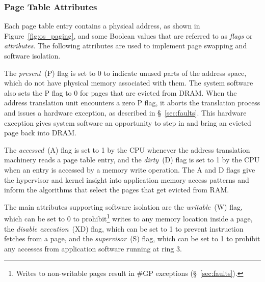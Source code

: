 \subsubsection{Page Table Attributes}
\label{sec:page_table_attributes}

Each page table entry contains a physical address, as shown in
Figure~\ref{fig:os_paging}, and some Boolean values that are referred to as
\textit{flags} or \textit{attributes}. The following attributes are used to
implement page swapping and software isolation.

The \textit{present}~(P) flag is set to 0 to indicate unused parts
of the address space, which do not have physical memory associated with them.
The system software also sets the P flag to 0 for pages that are evicted from
DRAM. When the address translation unit encounters a zero P flag, it aborts the
translation process and issues a hardware exception, as described in
\S~\ref{sec:faults}. This hardware exception gives system software an
opportunity to step in and bring an evicted page back into DRAM.

The \textit{accessed}~(A) flag is set to 1 by the CPU whenever the address
translation machinery reads a page table entry, and the \textit{dirty}~(D) flag
is set to 1 by the CPU when an entry is accessed by a memory write operation.
The A and D flags give the hypervisor and kernel insight into application
memory access patterns and inform the algorithms that select the pages that get
evicted from RAM.


The main attributes supporting software isolation are the
\textit{writable}~(W) flag, which can be set to 0 to
prohibit\footnote{Writes to non-writable pages result in \#GP exceptions
(\S~\ref{sec:faults}).} writes to any memory location inside a page, the
\textit{disable execution}~(XD) flag, which can be set to 1 to prevent
instruction fetches from a page, and the \textit{supervisor}~(S) flag, which
can be set to 1 to prohibit any accesses from application software running at
ring 3.

